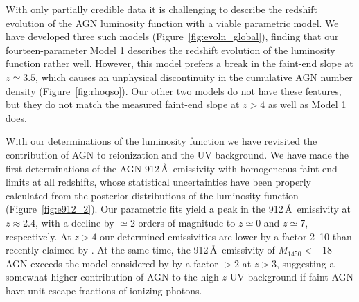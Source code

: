 \documentclass[fleqn,usenatbib]{mnras}
\begin{document}
With only partially credible data it is challenging to describe the redshift evolution of the AGN luminosity function
with a viable parametric model. We have developed three such models (Figure~\ref{fig:evoln_global}),
finding that our fourteen-parameter Model 1 describes the redshift evolution of the luminosity function rather well.
However, this model prefers a break in the faint-end slope at $z\simeq 3.5$, which causes an unphysical
discontinuity in the cumulative AGN number density (Figure~\ref{fig:rhoqso}). Our other two models do not have
these features, but they do not match the measured faint-end slope at $z>4$ as well as Model 1 does.

With our determinations of the luminosity function we have revisited the contribution of AGN to reionization and the UV background.
We have made the first determinations of the AGN 912\,\AA\ emissivity with homogeneous faint-end limits at all redshifts,
whose statistical uncertainties have been properly calculated from the posterior distributions of the luminosity function
(Figure~\ref{fig:e912_2}). Our parametric fits yield a peak in the 912\,\AA\ emissivity at $z\approx 2.4$, with a decline
by $\simeq 2$ orders of magnitude to $z\simeq 0$ and $z\simeq 7$, respectively. At $z>4$ our determined emissivities
are lower by a factor 2--10 than recently claimed by \citet{2015AA...578A..83G}. At the same time, the 912\,\AA\ emissivity
of $M_{1450}<-18$ AGN exceeds the model considered by \citet{2012ApJ...746..125H} by a factor $>2$ at $z>3$,
suggesting a somewhat higher contribution of AGN to the high-$z$ UV background if faint AGN have unit escape fractions
of ionizing photons. 
\end{document}
